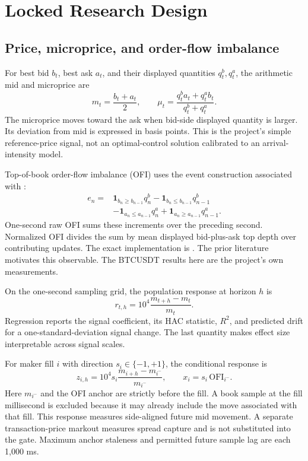 \section{Locked Research Design}

\subsection{Price, microprice, and order-flow imbalance}

For best bid $b_t$, best ask $a_t$, and their displayed quantities $q^b_t,q^a_t$,
the arithmetic mid and microprice are
\begin{equation}
 m_t=\frac{b_t+a_t}{2},\qquad
 \mu_t=\frac{q^b_ta_t+q^a_tb_t}{q^b_t+q^a_t}.
\end{equation}
The microprice moves toward the ask when bid-side displayed quantity is larger.
Its deviation from mid is expressed in basis points. This is the project's
simple reference-price signal, not an optimal-control solution calibrated to
an arrival-intensity model.

Top-of-book order-flow imbalance (OFI) uses the event construction associated
with \citet{cont2014}:
\begin{align}
 e_n={}&\mathbf{1}_{b_n\ge b_{n-1}}q^b_n
 -\mathbf{1}_{b_n\le b_{n-1}}q^b_{n-1} \\
 &-\mathbf{1}_{a_n\le a_{n-1}}q^a_n
 +\mathbf{1}_{a_n\ge a_{n-1}}q^a_{n-1}.
\end{align}
One-second raw OFI sums these increments over the preceding second. Normalized
OFI divides the sum by mean displayed bid-plus-ask top depth over contributing
updates. The exact implementation is .
The prior literature motivates this observable. The BTCUSDT results here are
the project's own measurements.

On the one-second sampling grid, the population response at horizon $h$ is
\begin{equation}
 r_{t,h}=10^4\frac{m_{t+h}-m_t}{m_t}.
\end{equation}
Regression reports the signal coefficient, its HAC statistic, $R^2$, and
predicted drift for a one-standard-deviation signal change. The last quantity
makes effect size interpretable across signal scales.

For maker fill $i$ with direction $s_i\in\{-1,+1\}$, the conditional response is
\begin{equation}
 z_{i,h}=10^4s_i\frac{m_{i+h}-m_{i^-}}{m_{i^-}},
 \qquad x_i=s_i\,\mathrm{OFI}_{i^-}.
\end{equation}
Here $m_{i^-}$ and the OFI anchor are strictly before the fill. A book sample at
the fill millisecond is excluded because it may already include the move
associated with that fill. This response measures side-aligned future mid
movement. A separate transaction-price markout measures spread capture and is
not substituted into the gate. Maximum anchor staleness and permitted future
sample lag are each 1,000 ms.

